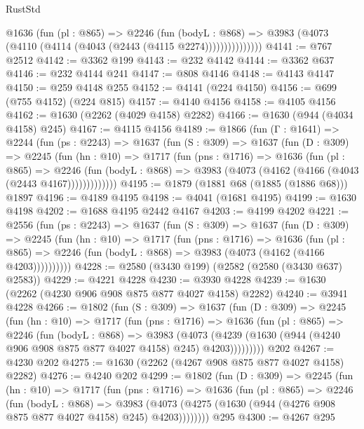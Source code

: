 \begin{lexlean}{RustStd}
\begin{coremodule}
                @1636
                  (fun (pl : @865) =>
                  @2246
                    (fun (bodyL : @868) =>
                    @3983 (@4073 (@4110 (@4114 (@4043 (@2443 (@4115 @2274)))))))))))))))
@4141 := @767 @2512
@4142 := @3362 @199
@4143 := @232 @4142
@4144 := @3362 @637
@4146 := @232 @4144 @241
@4147 := @808 @4146
@4148 := @4143 @4147
@4150 := @259 @4148 @255
@4152 := @4141 (@224 @4150)
@4156 := @699 (@755 @4152) (@224 @815)
@4157 := @4140 @4156
@4158 := @4105 @4156
@4162 := @1630 (@2262 (@4029 @4158) @2282)
@4166 := @1630 (@944 (@4034 @4158) @245)
@4167 := @4115 @4156
@4189 := @1866
    (fun (Γ : @1641) =>
    @2244
      (fun (ps : @2243) =>
      @1637
        (fun (S : @309) =>
        @1637
          (fun (D : @309) =>
          @2245
            (fun (hn : @10) =>
            @1717
              (fun (pns : @1716) =>
              @1636
                (fun (pl : @865) =>
                @2246
                  (fun (bodyL : @868) => @3983 (@4073 (@4162 (@4166 (@4043 (@2443 @4167)))))))))))))
@4195 := @1879 (@1881 @68 (@1885 (@1886 @68))) @1897
@4196 := @4189 @4195
@4198 := @4041 (@1681 @4195)
@4199 := @1630 @4198
@4202 := @1688 @4195 @2442 @4167
@4203 := @4199 @4202
@4221 := @2556
    (fun (ps : @2243) =>
    @1637
      (fun (S : @309) =>
      @1637
        (fun (D : @309) =>
        @2245
          (fun (hn : @10) =>
          @1717
            (fun (pns : @1716) =>
            @1636
              (fun (pl : @865) =>
              @2246 (fun (bodyL : @868) => @3983 (@4073 (@4162 (@4166 @4203))))))))))
@4228 := @2580 (@3430 @199) (@2582 (@2580 (@3430 @637) @2583))
@4229 := @4221 @4228
@4230 := @3930 @4228
@4239 := @1630 (@2262 (@4230 @906 @908 @875 @877 @4027 @4158) @2282)
@4240 := @3941 @4228
@4266 := @1802
    (fun (S : @309) =>
    @1637
      (fun (D : @309) =>
      @2245
        (fun (hn : @10) =>
        @1717
          (fun (pns : @1716) =>
          @1636
            (fun (pl : @865) =>
            @2246
              (fun (bodyL : @868) =>
              @3983
                (@4073
                  (@4239 (@1630 (@944 (@4240 @906 @908 @875 @877 @4027 @4158) @245) @4203)))))))))
    @202
@4267 := @4230 @202
@4275 := @1630 (@2262 (@4267 @908 @875 @877 @4027 @4158) @2282)
@4276 := @4240 @202
@4299 := @1802
    (fun (D : @309) =>
    @2245
      (fun (hn : @10) =>
      @1717
        (fun (pns : @1716) =>
        @1636
          (fun (pl : @865) =>
          @2246
            (fun (bodyL : @868) =>
            @3983 (@4073 (@4275 (@1630 (@944 (@4276 @908 @875 @877 @4027 @4158) @245) @4203))))))))
    @295
@4300 := @4267 @295

\end{coremodule}
\end{lexlean}
